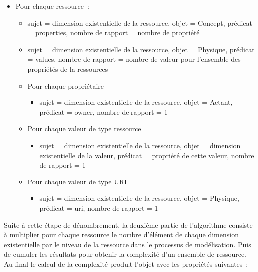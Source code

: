 \documentclass[
  letterpaper,
  DIV=11,
  numbers=noendperiod]{scrreprt}
\providecommand{\tightlist}{%
  \setlength{\itemsep}{0pt}\setlength{\parskip}{0pt}}\usepackage{longtable,booktabs,array}
\begin{document}
\begin{itemize}
\item
  Pour chaque ressource~:

  \begin{itemize}
  \item
    sujet = dimension existentielle de la ressource, objet = Concept,
    prédicat = properties, nombre de rapport = nombre de propriété
  \item
    sujet = dimension existentielle de la ressource, objet = Physique,
    prédicat = values, nombre de rapport = nombre de valeur pour
    l'ensemble des propriétés de la ressources
  \item
    Pour chaque propriétaire

    \begin{itemize}
    \tightlist
    \item
      sujet = dimension existentielle de la ressource, objet = Actant,
      prédicat = owner, nombre de rapport = 1
    \end{itemize}
  \item
    Pour chaque valeur de type ressource

    \begin{itemize}
    \tightlist
    \item
      sujet = dimension existentielle de la ressource, objet = dimension
      existentielle de la valeur, prédicat = propriété de cette valeur,
      nombre de rapport = 1
    \end{itemize}
  \item
    Pour chaque valeur de type URI

    \begin{itemize}
    \tightlist
    \item
      sujet = dimension existentielle de la ressource, objet = Physique,
      prédicat = uri, nombre de rapport = 1
    \end{itemize}
  \end{itemize}
\end{itemize}

Suite à cette étape de dénombrement, la deuxième partie de l'algorithme
consiste à multiplier pour chaque ressource le nombre d'élément de
chaque dimension existentielle par le niveau de la ressource dans le
processus de modélisation. Puis de cumuler les résultats pour obtenir la
complexité d'un ensemble de ressource. Au final le calcul de la
complexité produit l'objet avec les propriétés suivantes~:
\end{document}
